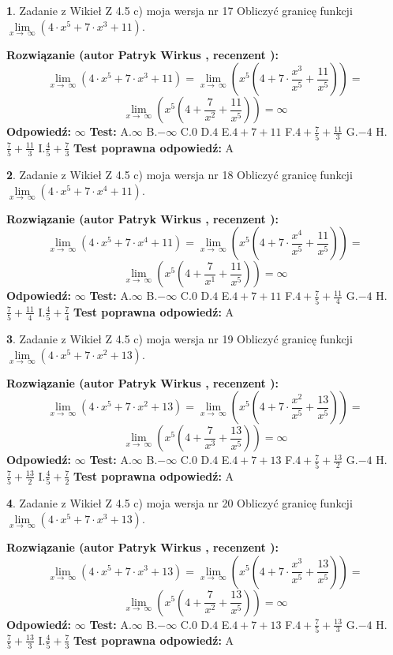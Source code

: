 \documentclass[12pt, a4paper]{article}
\theoremstyle{definition} %
\newtheorem{zad}{}
\newcommand{\zadStart}[1]{\begin{zad}#1\newline}
\newcommand{\zadStop}{\end{zad}}
\newcommand{\rozwStart}[2]{\noindent \textbf{Rozwiązanie (autor #1 , recenzent #2): }\newline}
\newcommand{\rozwStop}{\newline}
\newcommand{\odpStart}{\noindent \textbf{Odpowiedź:}\newline}
\newcommand{\odpStop}{\newline}
\newcommand{\testStart}{\noindent \textbf{Test:}\newline}
\newcommand{\testStop}{\newline}
\newcommand{\kluczStart}{\noindent \textbf{Test poprawna odpowiedź:}\newline}
\newcommand{\kluczStop}{\newline}
\begin{document}
\zadStart{Zadanie z Wikieł Z 4.5 c) moja wersja nr 17}
Obliczyć granicę funkcji  $\lim\limits_{x\to\ \infty}(4 \cdot x^{5}+7 \cdot x^{3}+11)$.
\zadStop
\rozwStart{Patryk Wirkus}{}
$$\lim\limits_{x\to\ \infty}(4 \cdot x^{5}+7 \cdot x^{3}+11) = \lim\limits_{x\to\ \infty}(x^{5}(4 +7 \cdot \frac{x^{3}}{x^{5}}+\frac{11}{x^{5}})) =$$ $$\lim\limits_{x\to\ \infty}(x^{5}(4 +\frac{7}{x^{2}}+\frac{11}{x^{5}})) =\infty$$
\rozwStop
\odpStart
$\infty$
\odpStop
\testStart
A.$\infty$ B.$-\infty$ C.$0$ D.$4$ E.$4 + 7 + 11$
F.$4+\frac{7}{5}+\frac{11}{3}$ G.$-4$
H.$\frac{7}{5}+\frac{11}{3}$
I.$\frac{4}{5}+\frac{7}{3}$
\testStop
\kluczStart
A
\kluczStop



\zadStart{Zadanie z Wikieł Z 4.5 c) moja wersja nr 18}
Obliczyć granicę funkcji  $\lim\limits_{x\to\ \infty}(4 \cdot x^{5}+7 \cdot x^{4}+11)$.
\zadStop
\rozwStart{Patryk Wirkus}{}
$$\lim\limits_{x\to\ \infty}(4 \cdot x^{5}+7 \cdot x^{4}+11) = \lim\limits_{x\to\ \infty}(x^{5}(4 +7 \cdot \frac{x^{4}}{x^{5}}+\frac{11}{x^{5}})) =$$ $$\lim\limits_{x\to\ \infty}(x^{5}(4 +\frac{7}{x^{1}}+\frac{11}{x^{5}})) =\infty$$
\rozwStop
\odpStart
$\infty$
\odpStop
\testStart
A.$\infty$ B.$-\infty$ C.$0$ D.$4$ E.$4 + 7 + 11$
F.$4+\frac{7}{5}+\frac{11}{4}$ G.$-4$
H.$\frac{7}{5}+\frac{11}{4}$
I.$\frac{4}{5}+\frac{7}{4}$
\testStop
\kluczStart
A
\kluczStop



\zadStart{Zadanie z Wikieł Z 4.5 c) moja wersja nr 19}
Obliczyć granicę funkcji  $\lim\limits_{x\to\ \infty}(4 \cdot x^{5}+7 \cdot x^{2}+13)$.
\zadStop
\rozwStart{Patryk Wirkus}{}
$$\lim\limits_{x\to\ \infty}(4 \cdot x^{5}+7 \cdot x^{2}+13) = \lim\limits_{x\to\ \infty}(x^{5}(4 +7 \cdot \frac{x^{2}}{x^{5}}+\frac{13}{x^{5}})) =$$ $$\lim\limits_{x\to\ \infty}(x^{5}(4 +\frac{7}{x^{3}}+\frac{13}{x^{5}})) =\infty$$
\rozwStop
\odpStart
$\infty$
\odpStop
\testStart
A.$\infty$ B.$-\infty$ C.$0$ D.$4$ E.$4 + 7 + 13$
F.$4+\frac{7}{5}+\frac{13}{2}$ G.$-4$
H.$\frac{7}{5}+\frac{13}{2}$
I.$\frac{4}{5}+\frac{7}{2}$
\testStop
\kluczStart
A
\kluczStop



\zadStart{Zadanie z Wikieł Z 4.5 c) moja wersja nr 20}
Obliczyć granicę funkcji  $\lim\limits_{x\to\ \infty}(4 \cdot x^{5}+7 \cdot x^{3}+13)$.
\zadStop
\rozwStart{Patryk Wirkus}{}
$$\lim\limits_{x\to\ \infty}(4 \cdot x^{5}+7 \cdot x^{3}+13) = \lim\limits_{x\to\ \infty}(x^{5}(4 +7 \cdot \frac{x^{3}}{x^{5}}+\frac{13}{x^{5}})) =$$ $$\lim\limits_{x\to\ \infty}(x^{5}(4 +\frac{7}{x^{2}}+\frac{13}{x^{5}})) =\infty$$
\rozwStop
\odpStart
$\infty$
\odpStop
\testStart
A.$\infty$ B.$-\infty$ C.$0$ D.$4$ E.$4 + 7 + 13$
F.$4+\frac{7}{5}+\frac{13}{3}$ G.$-4$
H.$\frac{7}{5}+\frac{13}{3}$
I.$\frac{4}{5}+\frac{7}{3}$
\testStop
\kluczStart
A
\kluczStop
\end{document}
